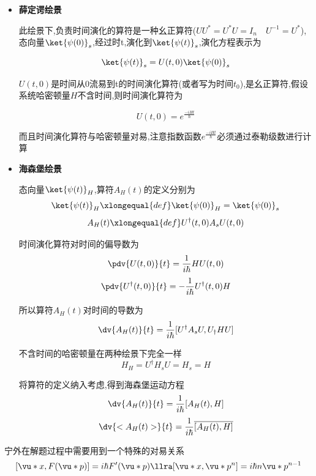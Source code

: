            \begin{formal}

                \begin{itemize}
                    \item 
                    \textbf{薛定谔绘景} 

                    此绘景下,负责时间演化的算符是一种幺正算符($ UU^{*} = U^{*}U = I_{n} \quad U^{-1} = U^{*} $),态向量$\ket{\psi(0)}_{s}$,经过时t,演化到$\ket{\psi(t)}_{s}$,演化方程表示为
    
                    $$ \ket{\psi(t)}_{s} = U(t,0) \ket{\psi(0)}_{s} $$
    
                    $U(t,0)$是时间从0流易到t的时间演化算符(或者写为时间$t_{0}$),是幺正算符,假设系统哈密顿量$H$不含时间,则时间演化算符为
    
                    $$ U(t,0) = e^{\frac{-iHt}{\hbar}} $$
    
                    而且时间演化算符与哈密顿量对易,注意指数函数$e^{\frac{-iHt}{\hbar}}$必须通过泰勒级数进行计算

                    \item   
                    \textbf{海森堡绘景} 

                    态向量$\ket{\psi(t)}_{H}$,算符$A_{H}(t)$的定义分别为
                    $$ \ket{\psi(t)}_{H} \xlongequal{def} \ket{\psi(0)}_{H} = \ket{\psi(0)}_{s}$$
                    $$ A_{H}(t) \xlongequal{def} U^{\dagger}(t,0)A_{s}U(t,0) $$

                    时间演化算符对时间的偏导数为
                    $$ \pdv{U(t,0)}{t} = \frac{1}{i\hbar} H U(t,0) $$
                    $$ \pdv{U^{\dagger}(t,0)}{t} = - \frac{1}{i\hbar} U^{\dagger}(t,0) H$$

                    所以算符$A_{H}(t)$对时间的导数为
                    $$ \dv{A_{H}(t)}{t} = \frac{1}{i \hbar} [U^{\dagger} A_{s} U,U_{\dagger} H U]$$

                    不含时间的哈密顿量在两种绘景下完全一样
                    $$ H_{H} = U^{\dagger} H_{s} U = H_{s} =H $$

                    将算符的定义纳入考虑,得到海森堡运动方程
                    $$ \dv{A_{H}(t)}{t} = \frac{1}{i\hbar} [A_{H}(t),H] $$
                    $$ \dv{<A_{H}(t)>}{t} = \frac{1}{i\hbar} \overline{[A_{H}(t),H]} $$
                \end{itemize}

                宁外在解题过程中需要用到一个特殊的对易关系
                $$ [\vu*{x} , F(\vu*{p})] = i\hbar F'(\vu*{p}) \llra [\vu*{x} , \vu*{p}^{n}] = i\hbar n \vu*{p}^{n-1} $$
                


                
            \end{formal}
            

